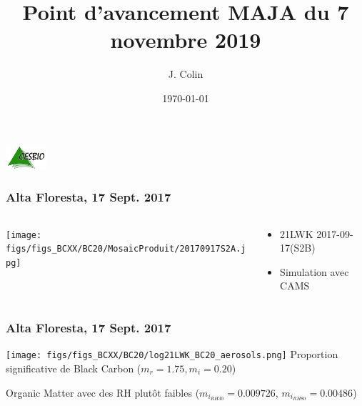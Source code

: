 \documentclass[8pt]{beamer}
\title{Point d'avancement MAJA du 7 novembre 2019}
\author{J. Colin\inst{1}}%
\institute{\inst{1}Centre d'\'Etudes Spatiales de la Biosph\`ere, France \url{jerome.colin@cesbio.cnes.fr}\\
}
\date{\today} %
\begin{document}
{
	\begin{frame}
		\vspace{.8cm}
		\includegraphics[width=1.5cm]{logo_cesbio_transp.pdf}
	\titlepage %
	\end{frame}
}



\begin{frame}
\frametitle{Alta Floresta, 17 Sept. 2017}
	
	\begin{columns}
		\begin{column}{0.7\textwidth}
			\begin{center}
				
		     	\texttt{[image: figs/figs\_BCXX/BC20/MosaicProduit/20170917S2A.jpg]}
		    \end{center}		
		\end{column}
		\begin{column}{0.3\textwidth}
			\begin{center}
				\begin{itemize}
					\item 21LWK 2017-09-17(S2B)
					\item Simulation avec CAMS
				\end{itemize}
		    \end{center}		
		\end{column}
	\end{columns}
\end{frame}

\begin{frame}
\frametitle{Alta Floresta, 17 Sept. 2017}
	\texttt{[image: figs/figs\_BCXX/BC20/log21LWK\_BC20\_aerosols.png]}
	Proportion significative de Black Carbon ($m_{r}=1.75, m_{i}=0.20$)
	
	Organic Matter avec des RH plutôt faibles ($m_{i_{RH30}}=0.009726$, $m_{i_{RH80}}=0.00486$)
\end{frame}
\end{document}
